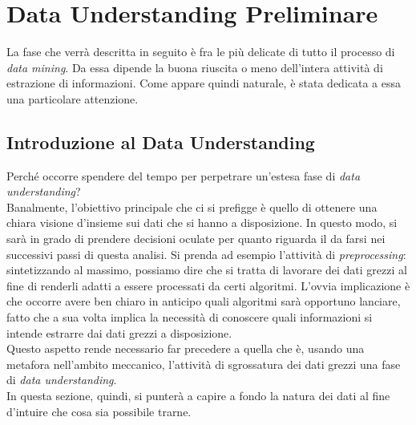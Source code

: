
\chapter{Data Understanding Preliminare}
\label{ch:undst}

La fase che verrà descritta in seguito è fra le più delicate di tutto il processo di \textit{data mining}. Da essa dipende la buona riuscita o meno dell'intera attività di estrazione di informazioni. Come appare quindi naturale, è stata dedicata a essa una particolare attenzione.

    \section{Introduzione al Data Understanding}

        Perché occorre spendere del tempo per perpetrare un'estesa fase di \textit{data understanding}? \\

        Banalmente, l'obiettivo principale che ci si prefigge è quello di ottenere una chiara visione d'insieme sui dati che si hanno a disposizione. In questo modo, si sarà in grado di prendere decisioni oculate per quanto riguarda il da farsi nei successivi passi di questa analisi. Si prenda ad esempio l'attività di \textit{preprocessing}: sintetizzando al massimo, possiamo dire che si tratta di lavorare dei dati grezzi al fine di renderli adatti a essere processati da certi algoritmi. L'ovvia implicazione è che occorre avere ben chiaro in anticipo quali algoritmi sarà opportuno lanciare, fatto che a sua volta implica la necessità di conoscere quali informazioni si intende estrarre dai dati grezzi a disposizione. \\

        Questo aspetto rende necessario far precedere a quella che è, usando una metafora nell'ambito meccanico, l'attività di sgrossatura dei dati grezzi una fase di \textit{data understanding}. \\

        In questa sezione, quindi, si punterà a capire a fondo la natura dei dati al fine d'intuire che cosa sia possibile trarne.

